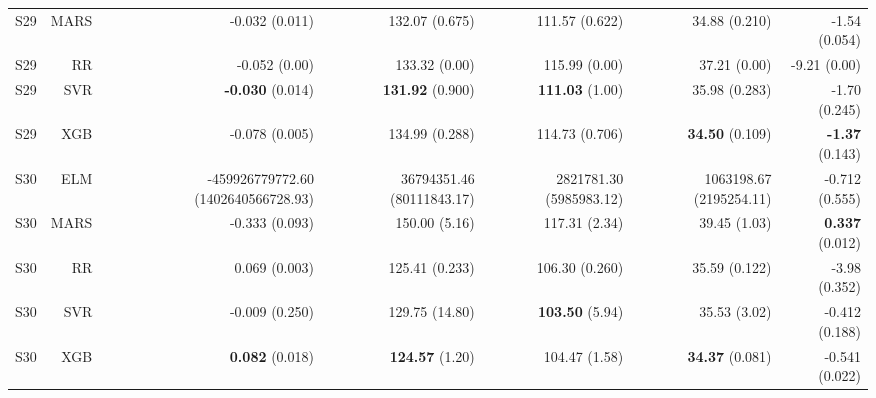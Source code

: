 \begin{table}
\begin{tabular}{rrrrrrr}
    S29 &      MARS &                      -0.032 (0.011) &            132.07 (0.675) &          111.57 (0.622) &           34.88 (0.210) &         -1.54 (0.054) \\
    S29 &        RR &                       -0.052 (0.00) &             133.32 (0.00) &           115.99 (0.00) &            37.21 (0.00) &          -9.21 (0.00) \\
    S29 &       SVR &               { \bf -0.030} (0.014) &     { \bf 131.92} (0.900) &    { \bf 111.03} (1.00) &           35.98 (0.283) &         -1.70 (0.245) \\
    S29 &       XGB &                      -0.078 (0.005) &            134.99 (0.288) &          114.73 (0.706) &    { \bf 34.50} (0.109) &  { \bf -1.37} (0.143) \\
    S30 &       ELM & -459926779772.60 (1402640566728.93) & 36794351.46 (80111843.17) & 2821781.30 (5985983.12) & 1063198.67 (2195254.11) &        -0.712 (0.555) \\
    S30 &      MARS &                      -0.333 (0.093) &             150.00 (5.16) &           117.31 (2.34) &            39.45 (1.03) &  { \bf 0.337} (0.012) \\
    S30 &        RR &                       0.069 (0.003) &            125.41 (0.233) &          106.30 (0.260) &           35.59 (0.122) &         -3.98 (0.352) \\
    S30 &       SVR &                      -0.009 (0.250) &            129.75 (14.80) &    { \bf 103.50} (5.94) &            35.53 (3.02) &        -0.412 (0.188) \\
    S30 &       XGB &                { \bf 0.082} (0.018) &      { \bf 124.57} (1.20) &           104.47 (1.58) &    { \bf 34.37} (0.081) &        -0.541 (0.022) \\
\bottomrule
\end{tabular}
\end{table}
